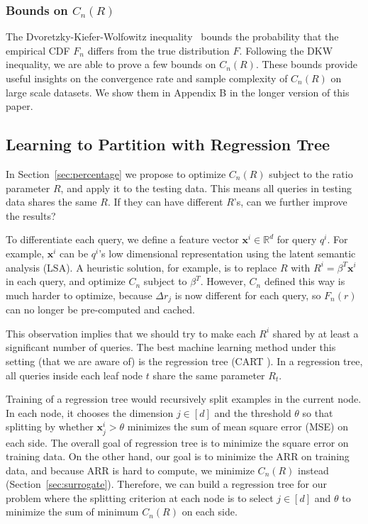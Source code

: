 \subsubsection{Bounds on $C_n(R)$}
The Dvoretzky-Kiefer-Wolfowitz inequality~\cite{Karimzadehgan:2010:ETI:1871437.1871631} bounds the probability that the empirical CDF $F_n$ differs from the true distribution $F$. Following the DKW inequality, we are able to prove a few bounds on $C_n(R)$. These bounds provide useful insights on the convergence rate and sample complexity of $C_n(R)$ on large scale datasets. We show them in Appendix B in the longer version of this paper.

\subsection{Learning to Partition with Regression Tree}
\label{sec:tree}
In Section~\ref{sec:percentage} we propose to optimize $C_n(R)$ subject to the ratio parameter $R$, and apply it to the testing data. This means all queries in testing data shares the same $R$. If they can have different $R$'s, can we further improve the results?

To differentiate each query, we define a feature vector $\mathbf{x}^i\in \mathbb{R}^d$ for query $q^i$. For example, $\mathbf{x}^i$ can be $q^i$'s low dimensional representation using the latent semantic analysis (LSA). A heuristic solution, for example, is to replace $R$ with $R^i = \beta^T \mathbf{x}^i$ in each query, and optimize $C_n$ subject to $\beta^T$. However, $C_n$ defined this way is much harder to optimize, because $\Delta r_j$ is now different for each query, so $F_n(r)$ can no longer be pre-computed and cached.

This observation implies that we should try to make each $R^i$ shared by at least a significant number of queries. The best machine learning method under this setting (that we are aware of) is the regression tree (CART \cite{BreimanEtAl:84}). In a regression tree, all queries inside each leaf node $t$ share the same parameter $R_t$. 

Training of a regression tree would recursively split examples in the current node. In each node, it chooses the dimension $j\in [d]$ and the threshold $\theta$ so that splitting by whether $\mathbf{x}^i_j > \theta$ minimizes the sum of mean square error (MSE) on each side. The overall goal of regression tree is to minimize the square error on training data. On the other hand, our goal is to minimize the ARR on training data, and because ARR is hard to compute, we minimize $C_n(R)$ instead (Section~\ref{sec:surrogate}). Therefore, we can build a regression tree for our problem where the splitting criterion at each node is to select $j\in [d]$ and $\theta$ to minimize the sum of minimum $C_n(R)$ on each side. 


